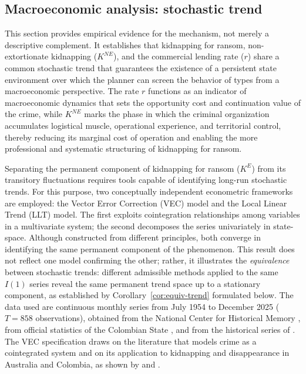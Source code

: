 \documentclass[ecta,nameyear,draft]{econsocart}
\theoremstyle{plain}
\theoremstyle{definition}
\newcommand{\1}{\mathbf{1}}
\begin{document}
\subsection{Macroeconomic analysis: stochastic trend}

This section provides empirical evidence for the mechanism, not merely a descriptive complement. It establishes that kidnapping for ransom, non-extortionate kidnapping ($K^{NE}$), and the commercial lending rate ($r$) share a common stochastic trend that guarantees the existence of a persistent state environment over which the planner can screen the behavior of types from a macroeconomic perspective. The rate $r$ functions as an indicator of macroeconomic dynamics that sets the opportunity cost and continuation value of the crime, while $K^{NE}$ marks the phase in which the criminal organization accumulates logistical muscle, operational experience, and territorial control, thereby reducing its marginal cost of operation and enabling the more professional and systematic structuring of kidnapping for ransom.

Separating the permanent component of kidnapping for ransom ($K^E$) from its transitory fluctuations requires tools capable of identifying long-run stochastic trends. For this purpose, two conceptually independent econometric frameworks are employed: the Vector Error Correction (VEC) model and the Local Linear Trend (LLT) model. The first exploits cointegration relationships among variables in a multivariate system; the second decomposes the series univariately in state-space. Although constructed from different principles, both converge in identifying the same permanent component of the phenomenon. This result does not reflect one model confirming the other; rather, it illustrates the \emph{equivalence} between stochastic trends: different admissible methods applied to the same $I(1)$ series reveal the same permanent trend space up to a stationary component, as established by Corollary~\ref{cor:equiv-trend} formulated below. The data used are continuous monthly series from July 1954 to December 2025 ($T=858$ observations), obtained from the National Center for Historical Memory \citet{CNMH2013, cnmh_datos}, from official statistics of the Colombian State \citet{mindefensa_stats}, and from the historical series of \citet{banrep_series_historicas}. The VEC specification draws on the literature that models crime as a cointegrated system and on its application to kidnapping and disappearance in Australia and Colombia, as shown by \citet{Masih1995} and \citet{Suarez_2025}.
\end{document}
